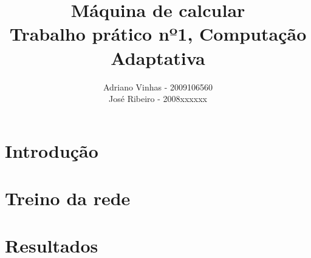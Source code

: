 \documentclass{article}
\begin{document}
\title{Máquina de calcular \\ Trabalho prático nº1, Computação Adaptativa}
\author{Adriano Vinhas - 2009106560\\
		José Ribeiro - 2008xxxxxx}
\maketitle
\clearpage

\section{Introdução}

\section{Treino da rede}

\section{Resultados}
\end{document}
